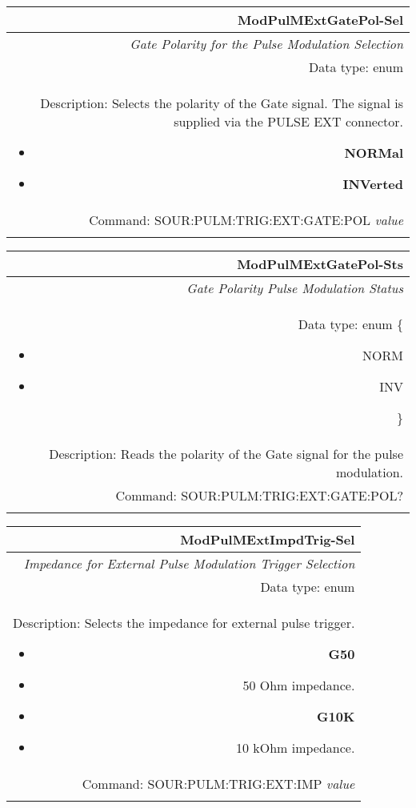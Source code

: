 \documentclass[openany]{article}
\begin{document}
		\begin{tabular}{N}
			\hline
			\bfseries ModPulMExtGatePol-Sel \\ \hline
			\emph{Gate Polarity for the Pulse Modulation Selection} \\
			Data type: enum \\  
			Description: Selects the polarity of the Gate signal. The signal is supplied via the PULSE EXT connector. \begin{itemize}[noitemsep]
				\small
				\item[] \textbf{NORMal}
                                \item[] \textbf{INVerted}
			\end{itemize} \\
			Command: SOUR:PULM:TRIG:EXT:GATE:POL \emph{value} \\
			\\

		\end{tabular}


		\begin{tabular}{N}
			\hline
			\bfseries ModPulMExtGatePol-Sts \\ \hline
			\emph{Gate Polarity Pulse Modulation Status} \\
			Data type: enum \{\begin{itemize}[noitemsep]
				\small
				\item[] NORM
				\item[] INV
			\end{itemize}\} \\ 
			Description: Reads the polarity of the Gate signal for the pulse modulation. \\
			Command: SOUR:PULM:TRIG:EXT:GATE:POL? \\
			\\

		\end{tabular}


		\begin{tabular}{N}
			\hline
			\bfseries ModPulMExtImpdTrig-Sel \\ \hline
			\emph{Impedance for External Pulse Modulation Trigger Selection} \\
			Data type: enum \\  
			Description: Selects the impedance for external pulse trigger. \begin{itemize}[noitemsep]
				\small
				\item[] \textbf{G50}
				\item[] 50 Ohm impedance.
                                \item[] \textbf{G10K}
				\item[] 10 kOhm impedance.
			\end{itemize} \\
			Command: SOUR:PULM:TRIG:EXT:IMP \emph{value} \\
			\\

		\end{tabular}
\end{document}
